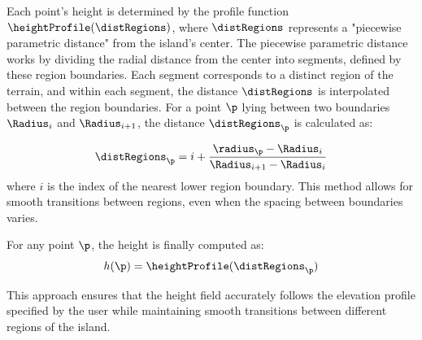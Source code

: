 Each point's height is determined by the profile function $\heightProfile(\distRegions)$, where $\distRegions$ represents a "piecewise parametric distance" from the island's center. The piecewise parametric distance works by dividing the radial distance from the center into segments, defined by these region boundaries. Each segment corresponds to a distinct region of the terrain, and within each segment, the distance $\distRegions$ is interpolated between the region boundaries. For a point $\p$ lying between two boundaries $\Radius_{i}$ and $\Radius_{i+1}$, the distance $\distRegions_\p$ is calculated as:

\begin{align}
    \distRegions_\p = i + \frac{\radius_\p - \Radius_{i}}{\Radius_{i + 1} - \Radius_{i}}
\end{align}
where $i$ is the index of the nearest lower region boundary. This method allows for smooth transitions between regions, even when the spacing between boundaries varies. 



For any point $\p$, the height is finally computed as:
\begin{align}
    h(\p) = \heightProfile(\distRegions_\p)
\end{align}

This approach ensures that the height field accurately follows the elevation profile specified by the user while maintaining smooth transitions between different regions of the island.

